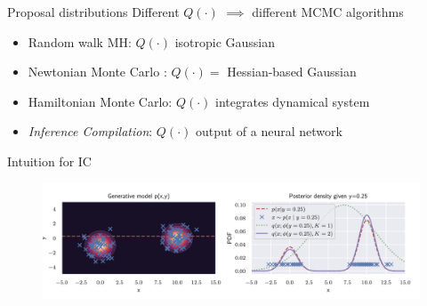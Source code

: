 \begin{frame}[fragile]{Proposal distributions}
    Different $Q(\cdot)$ $\implies$ different MCMC algorithms
    
    \begin{itemize}
        \item Random walk MH: $Q(\cdot)$ isotropic Gaussian
        \item Newtonian Monte Carlo \parencite{arora2020newtonian}:
        $Q(\cdot) =$ Hessian-based Gaussian
        \item Hamiltonian Monte Carlo: $Q(\cdot)$ integrates dynamical system
        \item \emph{Inference Compilation}: $Q(\cdot)$ output of a neural network
    \end{itemize}
\end{frame}

\begin{frame}{Intuition for IC}
    \begin{figure}
        \centering
        \includegraphics[width=\textwidth]{Figures/lic/intuition.png}
    \end{figure}
\end{frame}

	

